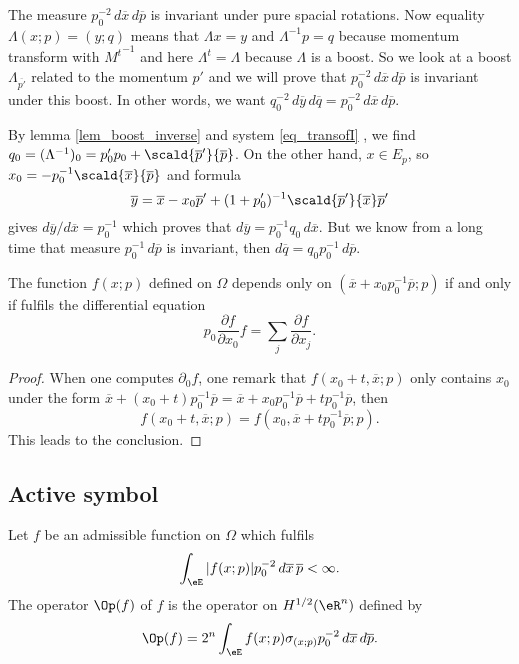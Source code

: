 The measure $p_0^{-2}\,d\overline{x}\,d\overline{p}$ is invariant under pure spacial rotations. Now equality $\Lambda(x;p)=(y;q)$ means that $\Lambda x=y$ and $\Lambda^{-1}p=q$ because momentum transform with ${M^t}^{-1}$ and here $\Lambda^t=\Lambda$ because $\Lambda$ is a boost. So we look at a boost $\Lambda_{\overline{p'}}$ related to the momentum $p'$ and we will prove that $p_0^{-2}\,d\overline{x}\,d\overline{p}$ is invariant under this boost. In other words, we want $q_0^{-2}\,d\overline{ y }\,d\overline{ q }=p_0^{-2}\,d\overline{x}\,d\overline{p}$.

By lemma \ref{lem_boost_inverse} and system \eqref{eq_transofI} , we find $q_0=(\Lambda^{-1})_0=p'_0p_0+\scald{ \overline{p}' }{ \overline{p} }$. On the other hand, $x\in E_p$, so $x_0=-p_0^{-1}\scald{ \overline{x} }{ \overline{p} }$ and formula
\[ 
  \overline{ y }=\overline{x}-x_0\overline{p}'+(1+p'_0)^{-1}\scald{ \overline{p}' }{ \overline{x} }\overline{p}'
\]
gives $d\overline{ y }/d\overline{x}=p_0^{-1}$ which proves that $d\overline{ y }=p_0^{-1}q_0\,d\overline{x}$. But we know from a long time that measure $p_0^{-1}\,d\overline{p}$ is invariant, then $d\overline{ q }=q_0p_0^{-1}\,d\overline{p}$.

\begin{lemma}
 The function $f(x;p)$ defined on $\Omega$ depends only on $(\overline{x}+x_0p_0^{-1}\overline{p};p)$ if and only if fulfils the differential equation
\begin{equation}
  p_0\frac{ \partial f }{ \partial x_0 }f=\sum_j \frac{ \partial f }{ \partial x_j }.
\end{equation}

\end{lemma}


\begin{proof}
When one computes $\partial_0f$, one remark that $f(x_0+t,\overline{x};p)$ only contains $x_0$ under the form $\overline{x}+(x_0+t)p_0^{-1}\overline{p}=\overline{x}+x_0p_0^{-1}\overline{p}+tp_0^{-1}\overline{p}$, then
\[ 
  f(x_0+t,\overline{x};p)=f(x_0,\overline{x}+tp_0^{-1}\overline{p};p).
\]
This leads to the conclusion.
\end{proof}

\subsection{Active symbol}

Let $f$ be an admissible function on $\Omega$ which fulfils
\[ 
  \int_{\eE} | f(x;p) |p_0^{-2}\,d\overline{x}\,\overline{p}<\infty.
\]
The operator $\Op(f)$ of  $f$ is the operator on $H^{1/2}(\eR^n)$ defined by
\begin{equation}
  \Op(f)=2^n\int_{\eE} f(x;p)\sigma_{(x;p)}p_0^{-2}\,d\overline{x}\,d\overline{p}.
\end{equation}

